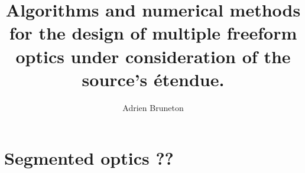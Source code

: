 \documentclass[10pt,a4paper]{book}
\author{Adrien Bruneton}
\title{Algorithms and numerical methods for the design of multiple freeform optics
under consideration of the source's \'etendue.}
\numberwithin{equation}{section}
\numberwithin{figure}{section}
\begin{document}
\tableofcontents










% 
\chapter{Segmented optics ??}





\end{document}
